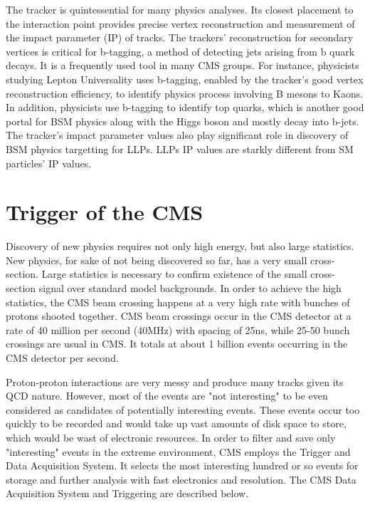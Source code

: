 The tracker is quintessential for many physics analyses.
Its closest placement to the interaction point provides precise vertex reconstruction and measurement of the impact parameter (IP) of tracks.
The trackers' reconstruction for secondary vertices is critical for b-tagging, a method of detecting jets arising from b quark decays.
It is a frequently used tool in many CMS groups.
For instance, physicists studying Lepton Universality uses b-tagging, enabled by the tracker's good vertex reconstruction efficiency, to identify physics process involving B mesons to Kaons.
In addition, physicists use b-tagging to identify top quarks, which is another good portal for BSM physics along with the Higgs boson and mostly decay into b-jets.
The tracker's impact parameter values also play significant role in discovery of BSM physics targetting for LLPs.
LLPs IP values are starkly different from SM particles' IP values.



\section{Trigger of the CMS}
Discovery of new physics requires not only high energy, but also large statistics.
New physics, for sake of not being discovered so far, has a very small cross-section.
Large statistics is necessary to confirm existence of the small cross-section signal over standard model backgrounds.
In order to achieve the high statistics, the CMS beam crossing happens at a very high rate with bunches of protons shooted together.
CMS beam crossings occur in the CMS detector at a rate of 40 million per second (40MHz) with spacing of 25ns, while 25-50 bunch crossings are usual in CMS.
It totals at about 1 billion events occurring in the CMS detector per second. 

Proton-proton interactions are very messy and produce many tracks given its QCD nature.
However, most of the events are "not interesting" to be even considered as candidates of potentially interesting events.
These events occur too quickly to be recorded and would take up vast amounts of disk space to store, which would be wast of electronic resources. 
In order to filter and save only "interesting" events in the extreme environment, CMS employs the Trigger and Data Acquisition System. 
It selects the most interesting hundred or so events for storage and further analysis with fast electronics and resolution.
The CMS Data Acquisition System and Triggering are described below.

